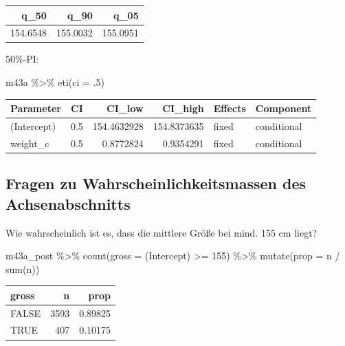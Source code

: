 \documentclass[
  a4paper,
  DIV=11]{scrreprt}
\newenvironment{Shaded}{\begin{snugshade}}{\end{snugshade}}
\newcommand{\AttributeTok}[1]{\textcolor[rgb]{0.40,0.45,0.13}{#1}}
\newcommand{\DecValTok}[1]{\textcolor[rgb]{0.68,0.00,0.00}{#1}}
\newcommand{\FunctionTok}[1]{\textcolor[rgb]{0.28,0.35,0.67}{#1}}
\newcommand{\NormalTok}[1]{\textcolor[rgb]{0.00,0.23,0.31}{#1}}
\newcommand{\SpecialCharTok}[1]{\textcolor[rgb]{0.37,0.37,0.37}{#1}}
\newcommand{\StringTok}[1]{\textcolor[rgb]{0.13,0.47,0.30}{#1}}
\theoremstyle{definition}
\theoremstyle{remark}
\begin{document}
\begin{longtable}[]{@{}rrr@{}}
\toprule()
q\_50 & q\_90 & q\_05 \\
\midrule()
\endhead
154.6548 & 155.0032 & 155.0951 \\
\bottomrule()
\end{longtable}

50\%-PI:

\begin{Shaded}
\begin{Highlighting}[]
\NormalTok{m43a }\SpecialCharTok{\%\textgreater{}\%} 
  \FunctionTok{eti}\NormalTok{(}\AttributeTok{ci =}\NormalTok{ .}\DecValTok{5}\NormalTok{)}
\end{Highlighting}
\end{Shaded}

\begin{longtable}[]{@{}lrrrll@{}}
\toprule()
Parameter & CI & CI\_low & CI\_high & Effects & Component \\
\midrule()
\endhead
(Intercept) & 0.5 & 154.4632928 & 154.8373635 & fixed & conditional \\
weight\_c & 0.5 & 0.8772824 & 0.9354291 & fixed & conditional \\
\bottomrule()
\end{longtable}

\hypertarget{fragen-zu-wahrscheinlichkeitsmassen-des-achsenabschnitts}{%
\subsection{Fragen zu Wahrscheinlichkeitsmassen des
Achsenabschnitts}\label{fragen-zu-wahrscheinlichkeitsmassen-des-achsenabschnitts}}

Wie wahrscheinlich ist es, dass die mittlere Größe bei mind. 155 cm
liegt?

\begin{Shaded}
\begin{Highlighting}[]
\NormalTok{m43a\_post }\SpecialCharTok{\%\textgreater{}\%} 
  \FunctionTok{count}\NormalTok{(}\AttributeTok{gross =} \StringTok{\textasciigrave{}}\AttributeTok{(Intercept)}\StringTok{\textasciigrave{}} \SpecialCharTok{\textgreater{}=} \DecValTok{155}\NormalTok{) }\SpecialCharTok{\%\textgreater{}\%} 
  \FunctionTok{mutate}\NormalTok{(}\AttributeTok{prop =}\NormalTok{ n }\SpecialCharTok{/} \FunctionTok{sum}\NormalTok{(n))}
\end{Highlighting}
\end{Shaded}

\begin{longtable}[]{@{}lrr@{}}
\toprule()
gross & n & prop \\
\midrule()
\endhead
FALSE & 3593 & 0.89825 \\
TRUE & 407 & 0.10175 \\
\bottomrule()
\end{longtable}
\end{document}

